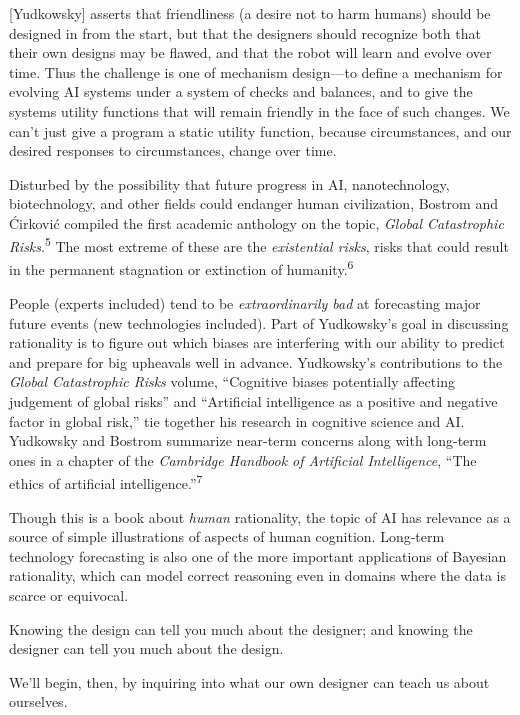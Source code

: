 {
 [Yudkowsky] asserts that friendliness (a desire not to harm
humans) should be designed in from the start, but that the designers
should recognize both that their own designs may be flawed, and that
the robot will learn and evolve over time. Thus the challenge is one of
mechanism design---to define a mechanism for evolving AI systems under
a system of checks and balances, and to give the systems utility
functions that will remain friendly in the face of such changes. We
can't just give a program a static utility function,
because circumstances, and our desired responses to circumstances,
change over time.}

{
 Disturbed by the possibility that future progress in AI,
nanotechnology, biotechnology, and other fields could endanger human
civilization, Bostrom and \'Cirkovi\'c compiled the first academic
anthology on the topic, \textit{Global Catastrophic
Risks}.\textsuperscript{5} The most extreme of these are the
\textit{existential risks}, risks that could result in the permanent
stagnation or extinction of humanity.\textsuperscript{6}}

{
 People (experts included) tend to be \textit{extraordinarily bad}
at forecasting major future events (new technologies included). Part of
Yudkowsky's goal in discussing rationality is to figure
out which biases are interfering with our ability to predict and
prepare for big upheavals well in advance. Yudkowsky's
contributions to the \textit{Global Catastrophic Risks} volume,
``Cognitive biases potentially affecting judgement of
global risks'' and ``Artificial
intelligence as a positive and negative factor in global
risk,'' tie together his research in cognitive
science and AI. Yudkowsky and Bostrom summarize near-term concerns
along with long-term ones in a chapter of the \textit{Cambridge
Handbook of Artificial Intelligence}, ``The ethics of
artificial intelligence.''\textsuperscript{7}}

{
 Though this is a book about \textit{human} rationality, the topic
of AI has relevance as a source of simple illustrations of aspects of
human cognition. Long-term technology forecasting is also one of the
more important applications of Bayesian rationality, which can model
correct reasoning even in domains where the data is scarce or
equivocal.}

{
 Knowing the design can tell you much about the designer; and
knowing the designer can tell you much about the design.}

{
 We'll begin, then, by inquiring into what our own
designer can teach us about ourselves.}

